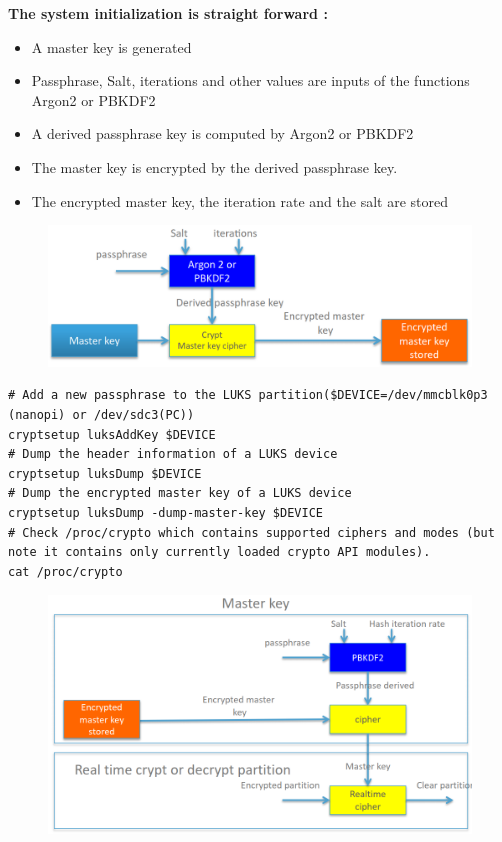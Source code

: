 \documentclass[resume]{subfiles}
\begin{document}
\textbf{The system initialization is straight forward :}
\begin{itemize}
\item A master key is generated
\item Passphrase, Salt, iterations and other values are inputs of the functions Argon2 or PBKDF2
\item A derived passphrase key is computed by Argon2 or PBKDF2
\item The master key is encrypted by the derived passphrase key.
\item The encrypted master key, the iteration rate and the salt are stored
\end{itemize}

\begin{figure}[H]
    \centering
    \includegraphics[width=1\columnwidth]{Figures/fileSystem/luksKeyGen.png}
    \label{fig:luksKeyGen}
\end{figure}

\begin{lstlisting}[style=console,label={},caption={}]
# Add a new passphrase to the LUKS partition($DEVICE=/dev/mmcblk0p3 (nanopi) or /dev/sdc3(PC))
cryptsetup luksAddKey $DEVICE
# Dump the header information of a LUKS device
cryptsetup luksDump $DEVICE
# Dump the encrypted master key of a LUKS device
cryptsetup luksDump -dump-master-key $DEVICE
# Check /proc/crypto which contains supported ciphers and modes (but note it contains only currently loaded crypto API modules).
cat /proc/crypto
\end{lstlisting}

\begin{figure}[H]
    \centering
    \includegraphics[width=1\columnwidth]{Figures/fileSystem/luksMastKey.png}
    \label{fig:luksMastKey}
\end{figure}
\end{document}
